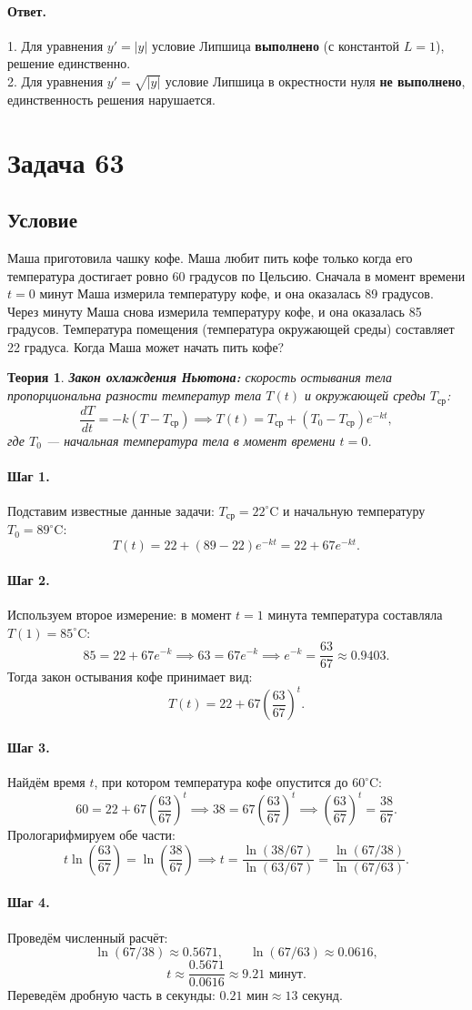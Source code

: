 \documentclass[12pt,a4paper]{article}
\theoremstyle{solution}
\newtheorem*{theory}{Теория}
\newcommand{\task}[1]{\newpage\section*{Задача #1}}
\newcommand{\answer}{\paragraph{Ответ.}}
\newcommand{\step}[1]{\paragraph{Шаг #1.}}
\begin{document}
\answer
1. Для уравнения $y' = |y|$ условие Липшица \textbf{выполнено} (с константой $L = 1$), решение единственно.\\
2. Для уравнения $y' = \sqrt{|y|}$ условие Липшица в окрестности нуля \textbf{не выполнено}, единственность решения нарушается.

\task{63}
\subsection*{Условие}
Маша приготовила чашку кофе. Маша любит пить кофе только когда его температура достигает ровно 60 градусов по Цельсию. Сначала в момент времени $t = 0$ минут Маша измерила температуру кофе, и она оказалась 89 градусов. Через минуту Маша снова измерила температуру кофе, и она оказалась 85 градусов. Температура помещения (температура окружающей среды) составляет 22 градуса. Когда Маша может начать пить кофе?

\begin{theory}
\textbf{Закон охлаждения Ньютона:} скорость остывания тела пропорциональна разности температур тела $T(t)$ и окружающей среды $T_{\text{ср}}$:
\[
\frac{dT}{dt} = -k (T - T_{\text{ср}}) \implies T(t) = T_{\text{ср}} + (T_0 - T_{\text{ср}}) e^{-kt},
\]
где $T_0$ — начальная температура тела в момент времени $t = 0$.
\end{theory}

\step{1} Подставим известные данные задачи: $T_{\text{ср}} = 22^\circ\text{C}$ и начальную температуру $T_0 = 89^\circ\text{C}$:
\[
T(t) = 22 + (89 - 22) e^{-kt} = 22 + 67 e^{-kt}.
\]

\step{2} Используем второе измерение: в момент $t = 1$ минута температура составляла $T(1) = 85^\circ\text{C}$:
\[
85 = 22 + 67 e^{-k} \implies 63 = 67 e^{-k} \implies e^{-k} = \frac{63}{67} \approx 0.9403.
\]
Тогда закон остывания кофе принимает вид:
\[
T(t) = 22 + 67 \left(\frac{63}{67}\right)^t.
\]

\step{3} Найдём время $t$, при котором температура кофе опустится до $60^\circ\text{C}$:
\[
60 = 22 + 67 \left(\frac{63}{67}\right)^t \implies 38 = 67 \left(\frac{63}{67}\right)^t \implies \left(\frac{63}{67}\right)^t = \frac{38}{67}.
\]
Прологарифмируем обе части:
\[
t \ln\left(\frac{63}{67}\right) = \ln\left(\frac{38}{67}\right) \implies t = \frac{\ln(38/67)}{\ln(63/67)} = \frac{\ln(67/38)}{\ln(67/63)}.
\]

\step{4} Проведём численный расчёт:
\[
\ln(67/38) \approx 0.5671, \qquad \ln(67/63) \approx 0.0616,
\]
\[
t \approx \frac{0.5671}{0.0616} \approx 9.21 \text{ минут}.
\]
Переведём дробную часть в секунды: $0.21 \text{ мин} \approx 13$ секунд.
\end{document}
